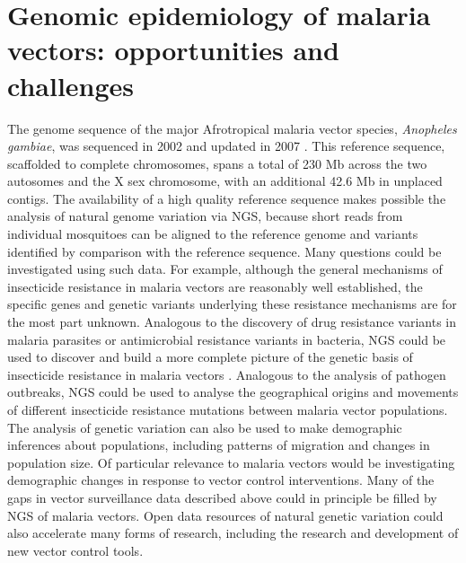 \documentclass[a4paper,11pt,abstracton,hidelinks]{scrartcl}
\begin{document}
\section{Genomic epidemiology of malaria vectors: opportunities and challenges}


The genome sequence of the major Afrotropical malaria vector species, \textit{Anopheles gambiae}, was sequenced in 2002 and updated in 2007 \citep{Holt2002,Sharakhova2007}.
%
This reference sequence, scaffolded to complete chromosomes, spans a total of 230 Mb across the two autosomes and the X sex chromosome, with an additional 42.6 Mb in unplaced contigs.
%
The availability of a high quality reference sequence makes possible the analysis of natural genome variation via NGS, because short reads from individual mosquitoes can be aligned to the reference genome and variants identified by comparison with the reference sequence.
%
Many questions could be investigated using such data.
%
For example, although the general mechanisms of insecticide resistance in malaria vectors are reasonably well established, the specific genes and genetic variants underlying these resistance mechanisms are for the most part unknown.
%
Analogous to the discovery of drug resistance variants in malaria parasites or antimicrobial resistance variants in bacteria, NGS could be used to discover and build a more complete picture of the genetic basis of insecticide resistance in malaria vectors \citep{Donnelly2016}.
%
Analogous to the analysis of pathogen outbreaks, NGS could be used to analyse the geographical origins and movements of different insecticide resistance mutations between malaria vector populations.
%
The analysis of genetic variation can also be used to make demographic inferences about populations, including patterns of migration and changes in population size.
%
Of particular relevance to malaria vectors would be investigating demographic changes in response to vector control interventions.
%
Many of the gaps in vector surveillance data described above could in principle be filled by NGS of malaria vectors.
%
Open data resources of natural genetic variation could also accelerate many forms of research, including the research and development of new vector control tools.
\end{document}

